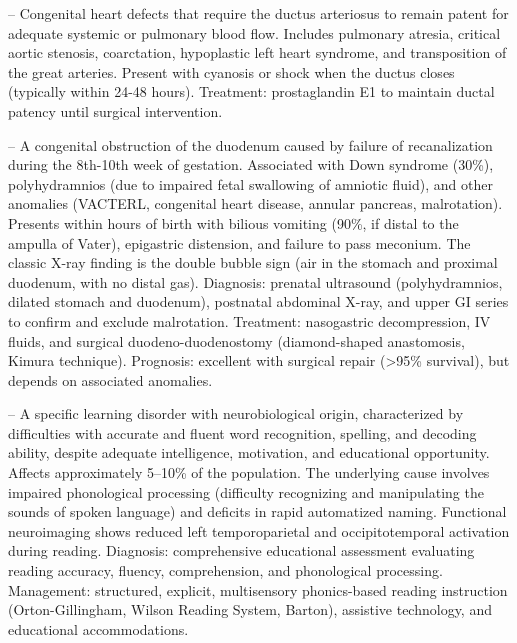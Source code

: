 -- Congenital heart defects that require the ductus arteriosus to remain patent for adequate systemic or pulmonary blood flow. Includes pulmonary atresia, critical aortic stenosis, coarctation, hypoplastic left heart syndrome, and transposition of the great arteries. Present with cyanosis or shock when the ductus closes (typically within 24-48 hours). Treatment: prostaglandin E1 to maintain ductal patency until surgical intervention.

-- A congenital obstruction of the duodenum caused by failure of recanalization during the 8th-10th week of gestation. Associated with Down syndrome (30\%), polyhydramnios (due to impaired fetal swallowing of amniotic fluid), and other anomalies (VACTERL, congenital heart disease, annular pancreas, malrotation). Presents within hours of birth with bilious vomiting (90\%, if distal to the ampulla of Vater), epigastric distension, and failure to pass meconium. The classic X-ray finding is the double bubble sign (air in the stomach and proximal duodenum, with no distal gas). Diagnosis: prenatal ultrasound (polyhydramnios, dilated stomach and duodenum), postnatal abdominal X-ray, and upper GI series to confirm and exclude malrotation. Treatment: nasogastric decompression, IV fluids, and surgical duodeno-duodenostomy (diamond-shaped anastomosis, Kimura technique). Prognosis: excellent with surgical repair (>95\% survival), but depends on associated anomalies.

-- A specific learning disorder with neurobiological origin, characterized by difficulties with accurate and fluent word recognition, spelling, and decoding ability, despite adequate intelligence, motivation, and educational opportunity. Affects approximately 5--10\% of the population. The underlying cause involves impaired phonological processing (difficulty recognizing and manipulating the sounds of spoken language) and deficits in rapid automatized naming. Functional neuroimaging shows reduced left temporoparietal and occipitotemporal activation during reading. Diagnosis: comprehensive educational assessment evaluating reading accuracy, fluency, comprehension, and phonological processing. Management: structured, explicit, multisensory phonics-based reading instruction (Orton-Gillingham, Wilson Reading System, Barton), assistive technology, and educational accommodations.

